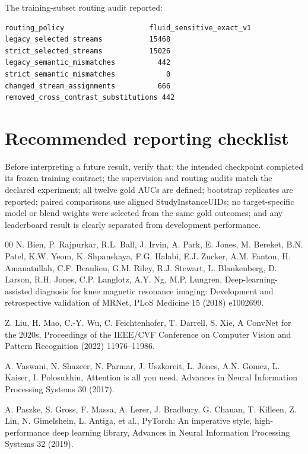 \documentclass[preprint,12pt]{elsarticle}
\begin{document}
The training-subset routing audit reported:
\begin{verbatim}
routing_policy                    fluid_sensitive_exact_v1
legacy_selected_streams           15468
strict_selected_streams           15026
legacy_semantic_mismatches          442
strict_semantic_mismatches            0
changed_stream_assignments          666
removed_cross_contrast_substitutions 442
\end{verbatim}

\section{Recommended reporting checklist}
Before interpreting a future result, verify that: the intended checkpoint completed its frozen training contract; the supervision and routing audits match the declared experiment; all twelve gold AUCs are defined; bootstrap replicates are reported; paired comparisons use aligned StudyInstanceUIDs; no target-specific model or blend weights were selected from the same gold outcomes; and any leaderboard result is clearly separated from development performance.

\begin{thebibliography}{00}
N. Bien, P. Rajpurkar, R.L. Ball, J. Irvin, A. Park, E. Jones, M. Bereket, B.N. Patel, K.W. Yeom, K. Shpanskaya, F.G. Halabi, E.J. Zucker, A.M. Fanton, H. Amanatullah, C.F. Beaulieu, G.M. Riley, R.J. Stewart, L. Blankenberg, D. Larson, R.H. Jones, C.P. Langlotz, A.Y. Ng, M.P. Lungren,
Deep-learning-assisted diagnosis for knee magnetic resonance imaging: Development and retrospective validation of MRNet,
PLoS Medicine 15 (2018) e1002699.

Z. Liu, H. Mao, C.-Y. Wu, C. Feichtenhofer, T. Darrell, S. Xie,
A ConvNet for the 2020s,
Proceedings of the IEEE/CVF Conference on Computer Vision and Pattern Recognition (2022) 11976--11986.

A. Vaswani, N. Shazeer, N. Parmar, J. Uszkoreit, L. Jones, A.N. Gomez, L. Kaiser, I. Polosukhin,
Attention is all you need,
Advances in Neural Information Processing Systems 30 (2017).

A. Paszke, S. Gross, F. Massa, A. Lerer, J. Bradbury, G. Chanan, T. Killeen, Z. Lin, N. Gimelshein, L. Antiga, et al.,
PyTorch: An imperative style, high-performance deep learning library,
Advances in Neural Information Processing Systems 32 (2019).
\end{thebibliography}
\end{document}

